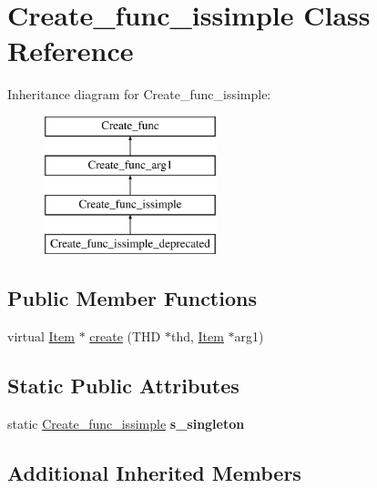 \hypertarget{classCreate__func__issimple}{}\section{Create\+\_\+func\+\_\+issimple Class Reference}
\label{classCreate__func__issimple}
Inheritance diagram for Create\+\_\+func\+\_\+issimple\+:\begin{figure}[H]
\begin{center}
\leavevmode
\includegraphics[height=4.000000cm]{classCreate__func__issimple}
\end{center}
\end{figure}
\subsection*{Public Member Functions}
\begin{DoxyCompactItemize}
\item 
virtual \mbox{\hyperlink{classItem}{Item}} $\ast$ \mbox{\hyperlink{classCreate__func__issimple_af481363c8e501313e097212ada345419}{create}} (T\+HD $\ast$thd, \mbox{\hyperlink{classItem}{Item}} $\ast$arg1)
\end{DoxyCompactItemize}
\subsection*{Static Public Attributes}
\begin{DoxyCompactItemize}
\item 
\mbox{\label{classCreate__func__issimple_abdab473ec7498b5b5b156fc784675a8c}} 
static \mbox{\hyperlink{classCreate__func__issimple}{Create\+\_\+func\+\_\+issimple}} {\bfseries s\+\_\+singleton}
\end{DoxyCompactItemize}
\subsection*{Additional Inherited Members}


